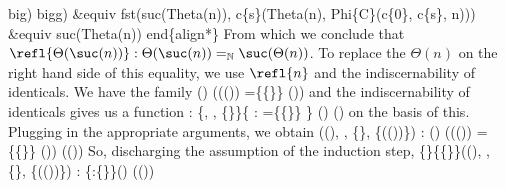     big)
  bigg)
  \&equiv
  fst(suc(Theta(n)), c\{s\}(Theta(n), Phi\{C\}(c\{0\}, c\{s\}, n)))
  \&equiv
  suc(Theta(n))
end\{align*\}
From which we conclude that $\refl{\Theta(\suc(n))} : \Theta(\suc(n))
=_{\mathbb{N}} \suc(\Theta(n))$.  To replace the $\Theta(n)$ on the right hand
side of this equality, we use $\refl{n}$ and the indiscernability of
identicals.  We have the family
  ()  ((()) =\coqdocvar{\_}\{\{\}\} ())
and the indiscernability of identicals gives us a function 
   : \{, , \{\}\}\{ :  =\coqdocvar{\_}\{\{\}\} \} ()  ()
on the basis of this.  Plugging in the appropriate arguments, we obtain
  ((), , \{\}, \{(())\}) : () 
  ((()) =\coqdocvar{\_}\{\{\}\} ())
   (())
So, discharging the assumption of the induction step,
    \{\}\{\{\}\}((), , \{\}, \{(())\})
  :
  \{:\{\}\}()  (())
